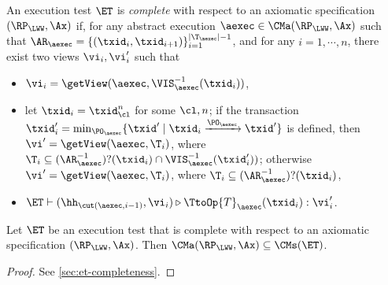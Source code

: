 \begin{definition}
\label{def:et_complete}
An execution test $\ET$ is \emph{complete} with respect 
to an axiomatic specification $(\RP_{\LWW}, \Ax)$ if, for any 
abstract execution $\aexec \in \CMa(\RP_{\LWW}, \Ax)$ 
such that $\AR_{\aexec} = \{(\txid_{i}, \txid_{i+1})\}_{i=1}^{\lvert \T_{\aexec} \rvert - 1}$, 
and for any $i=1,\cdots, n$, there exist two views $\vi_{i}, \vi_{i}'$ such that 
\begin{itemize}
\item $\vi_{i} = \getView(\aexec, \VIS_{\aexec}^{-1}(\txid_{i}))$, 
\item let $\txid_{i} = \txid_{\cl}^{n}$ for some $\cl, n$; if the
transaction $\txid_{i}' = \min_{\PO_{\aexec}}\{\txid' \mid \txid_i \xrightarrow{\PO_{\aexec}} \txid'\}$  
is defined, then $\vi' = \getView(\aexec, \T_{i})$, where $\T_{i} \subseteq (\AR_{\aexec}^{-1})?(\txid_{i}) \cap \VIS_{\aexec}^{-1}(\txid_{i}'))$; 
otherwise $\vi' = \getView(\aexec, \T_{i})$, where $\T_{i} \subseteq (\AR_{\aexec}^{-1})?(\txid_{i})$, 
\item $\ET \vdash (\hh_{\cut(\aexec, i-1)}, \vi_{i}) \triangleright \TtoOp{T}_{\aexec}(\txid_{i}) : \vi_{i}'$.
\end{itemize}
\end{definition}

\begin{theorem}
\label{thm:et_complete}
Let $\ET$ be an execution test that is complete with respect to 
an axiomatic specification $(\RP_{\LWW}, \Ax)$. Then 
$\CMa(\RP_{\LWW}, \Ax) \subseteq \CMs(\ET)$.
\end{theorem}
\begin{proof}
See \cref{sec:et-completeness}.
\end{proof}

